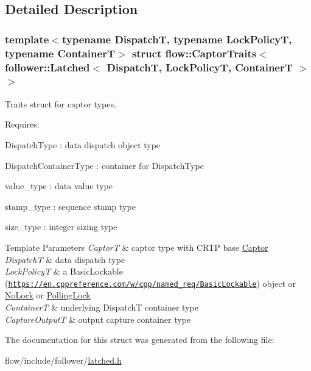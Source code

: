 \subsection{Detailed Description}
\subsubsection*{template$<$typename DispatchT, typename Lock\+PolicyT, typename ContainerT$>$\newline
struct flow\+::\+Captor\+Traits$<$ follower\+::\+Latched$<$ Dispatch\+T, Lock\+Policy\+T, Container\+T $>$ $>$}

Traits struct for captor types. 

Requires\+:
\begin{DoxyItemize}
\item {\ttfamily Dispatch\+Type} \+: data dispatch object type
\item {\ttfamily Dispatch\+Container\+Type} \+: container for {\ttfamily Dispatch\+Type}
\item {\ttfamily value\+\_\+type} \+: data value type
\item {\ttfamily stamp\+\_\+type} \+: sequence stamp type
\item {\ttfamily size\+\_\+type} \+: integer sizing type
\end{DoxyItemize}


\begin{DoxyTemplParams}{Template Parameters}
{\em CaptorT} & captor type with C\+R\+TP base {\ttfamily \hyperlink{classflow_1_1_captor}{Captor}}\\
\hline
{\em DispatchT} & data dispatch type \\
\hline
{\em Lock\+PolicyT} & a Basic\+Lockable (\href{https://en.cppreference.com/w/cpp/named_req/BasicLockable}{\tt https\+://en.\+cppreference.\+com/w/cpp/named\+\_\+req/\+Basic\+Lockable}) object or \hyperlink{structflow_1_1_no_lock}{No\+Lock} or \hyperlink{structflow_1_1_polling_lock}{Polling\+Lock} \\
\hline
{\em ContainerT} & underlying {\ttfamily DispatchT} container type \\
\hline
{\em Capture\+OutputT} & output capture container type \\
\hline
\end{DoxyTemplParams}


The documentation for this struct was generated from the following file\+:\begin{DoxyCompactItemize}
\item 
flow/include/follower/\hyperlink{latched_8h}{latched.\+h}\end{DoxyCompactItemize}
